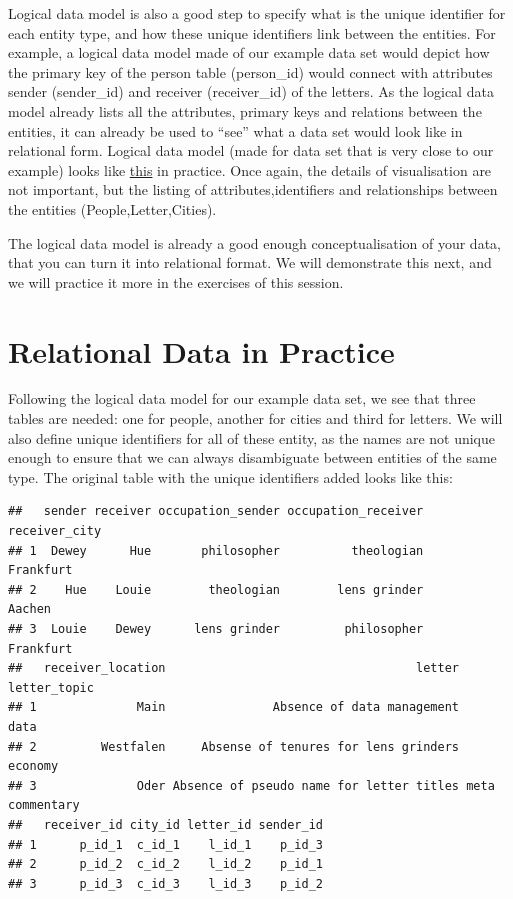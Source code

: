 \documentclass[
]{book}
\begin{document}
Logical data model is also a good step to specify what is the unique identifier for each entity type, and how these unique identifiers link between the entities. For example, a logical data model made of our example data set would depict how the primary key of the person table (person\_id) would connect with attributes sender (sender\_id) and receiver (receiver\_id) of the letters. As the logical data model
already lists all the attributes, primary keys and relations between the entities, it can already be used to ``see'' what a data set
would look like in relational form. Logical data model (made for data set that is very close to our example) looks like \href{https://docs.google.com/presentation/d/1Smp7f4hx62PvEkdsG5lB8JDcT9OwD-OzrLvXMw2XJEc/pub?start=false\&loop=false\&delayms=3000\#slide=id.g21405589cb_1_0}{this} in practice. Once again, the details of visualisation are not important, but the listing of attributes,identifiers and relationships between the entities (People,Letter,Cities).

The logical data model is already a good enough conceptualisation of your data, that you can turn it into relational format.
We will demonstrate this next, and we will practice it more in the exercises of this session.

\hypertarget{relational-data-in-practice}{%
\section{Relational Data in Practice}\label{relational-data-in-practice}}

Following the logical data model for our example data set, we see that three tables are needed: one for people, another for cities and third for letters. We will also define unique identifiers for all of these entity, as the names are not unique enough to ensure that we can always disambiguate between entities of the same type. The original table with the unique identifiers added looks like this:

\begin{verbatim}
##   sender receiver occupation_sender occupation_receiver receiver_city
## 1  Dewey      Hue       philosopher          theologian     Frankfurt
## 2    Hue    Louie        theologian        lens grinder        Aachen
## 3  Louie    Dewey      lens grinder         philosopher     Frankfurt
##   receiver_location                                   letter    letter_topic
## 1              Main               Absence of data management            data
## 2         Westfalen     Absense of tenures for lens grinders         economy
## 3              Oder Absence of pseudo name for letter titles meta commentary
##   receiver_id city_id letter_id sender_id
## 1      p_id_1  c_id_1    l_id_1    p_id_3
## 2      p_id_2  c_id_2    l_id_2    p_id_1
## 3      p_id_3  c_id_3    l_id_3    p_id_2
\end{verbatim}
\end{document}
